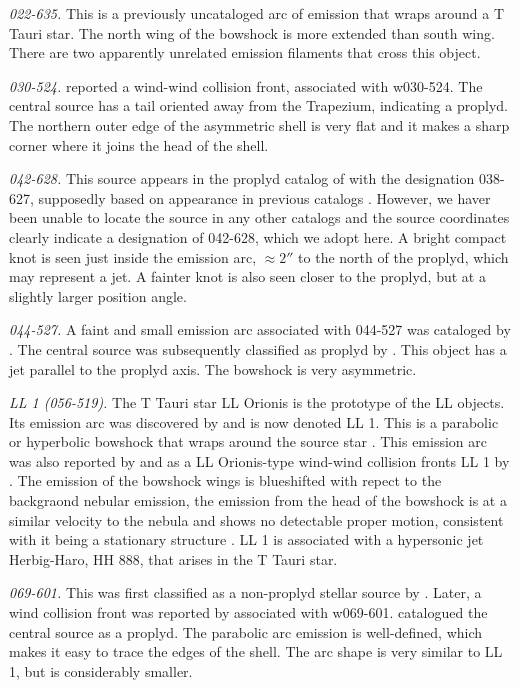 \documentclass[apj, twocolumn]{aastex63}
\begin{document}
\textit{022-635.} This is a previously uncataloged arc of emission that
wraps around a T Tauri star. The north wing of the bowshock is more
extended than south wing. There are two apparently unrelated emission
filaments that cross this object. 

\textit{030-524.} \citet{Bally:2000a} reported a wind-wind collision front,
associated with w030-524. The central source has a tail oriented away from
the Trapezium, indicating a proplyd. The northern outer edge of the
asymmetric shell is very flat and it makes a sharp corner where it joins
the head of the shell.


\textit{042-628.} This source appears in the proplyd catalog of
\citet{Ricci:2008a} with the designation 038-627, supposedly based on
appearance in previous catalogs \citep{ODell:1996a}. However, we haver
been unable to locate the source in any other catalogs and the source
coordinates clearly indicate a designation of 042-628, which we adopt
here.  A bright compact knot is seen just inside the emission arc,
\(\approx 2''\) to the north of the proplyd, which may represent a
jet.  A fainter knot is also seen closer to the proplyd, but at a
slightly larger position angle.

\textit{044-527.} A faint and small emission arc associated with 044-527
was cataloged by \citet{Bally:2000a}. The central source was subsequently
classified as proplyd by \citet{Ricci:2008a}. This object has a jet
parallel to the proplyd axis. The bowshock is very asymmetric.

\textit{LL 1 (056-519).} The T Tauri star LL Orionis is the prototype
of the LL objects. Its emission arc was discovered by
\citet{Gull:1979a} and is now denoted LL 1. This is a parabolic or
hyperbolic bowshock that wraps around the source star
\citep{Bally:2006a}. This emission arc was also reported by
\citet{Bally:2000a} and as a LL Orionis-type wind-wind collision
fronts LL 1 by \citet{Bally:2001a}. The emission of the bowshock wings
is blueshifted with repect to the backgraond nebular emission, the
emission from the head of the bowshock is at a similar velocity to the
nebula and shows no detectable proper motion, consistent with it being
a stationary structure \citep{Henney:2013a}. LL 1 is associated with a
hypersonic jet Herbig-Haro, HH 888, that arises in the T Tauri star.
    

\textit{069-601.} This was first classified as a non-proplyd stellar
source by \citet{ODell:1996a}. Later, a wind collision front was
reported by \citet{Bally:2000a} associated with w069-601.
\citet{Ricci:2008a} catalogued the central source as a proplyd.
The parabolic arc emission is well-defined, which makes it easy to
trace the edges of the shell. The arc shape is very similar to LL 1,
but is considerably smaller. 
\end{document}
